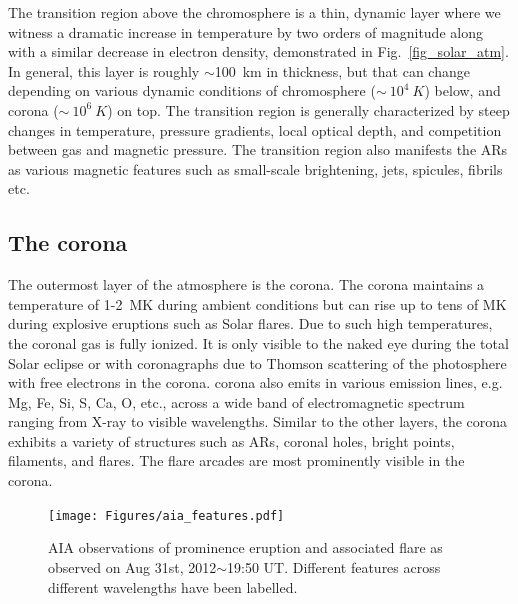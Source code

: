 The transition region above the chromosphere is a thin, dynamic layer where we witness a dramatic increase in temperature by two orders of magnitude along with a similar decrease in electron density, demonstrated in Fig.~\ref{fig_solar_atm}. In general, this layer is roughly $\sim$100~km in thickness, but that can change depending on various dynamic conditions of chromosphere ($\sim~10^{4}~K$) below, and corona ($\sim~10^{6}~K$) on top. The transition region is generally characterized by steep changes in temperature, pressure gradients, local optical depth, and competition between gas and magnetic pressure. The transition region also manifests the ARs as various magnetic features such as small-scale brightening, jets, spicules, fibrils etc. 

\subsection{The corona}\label{corona}

The outermost layer of the atmosphere is the corona. The corona maintains a temperature of 1-2~MK during ambient conditions but can rise up to tens of MK during explosive eruptions such as Solar flares. Due to such high temperatures, the coronal gas is fully ionized. It is only visible to the naked eye during the total Solar eclipse or with coronagraphs due to Thomson scattering of the photosphere with free electrons in the corona. corona also emits in various emission lines, e.g. Mg, Fe, Si, S, Ca, O, etc., across a wide band of electromagnetic spectrum ranging from X-ray to visible wavelengths. Similar to the other layers, the corona exhibits a variety of structures such as ARs, coronal holes, bright points, filaments, and flares. The flare arcades are most prominently visible in the corona. %

\begin{figure}[ht!]
    \centering
    \texttt{[image: Figures/aia\_features.pdf]}
    \caption[Different parts of a flare eruption observed across various wavelengths]{AIA observations of prominence eruption and associated flare as observed on Aug 31st, 2012$\sim$19:50 UT. Different features across different wavelengths have been labelled.}
    \label{fig:aia-feature}
\end{figure}

